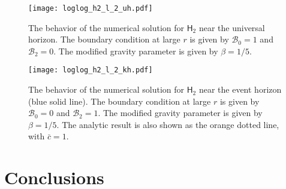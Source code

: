 \documentclass[aps,prd,preprintnumbers,superscriptaddress,nofootinbib,notitlepage]{revtex4-2}
\begin{document}
        \begin{figure}[tb]
            \begin{minipage}[b]{0.45\columnwidth}
                    \centering    \texttt{[image: loglog\_h2\_l\_2\_uh.pdf]}\centering
                    \caption{The behavior of the numerical solution for $\mathsf{H}_2$ near the universal horizon. The boundary condition at large $r$ is given by
                    $\mathcal{B}_0=1$ and $\mathcal{B}_2=0$.
                    The modified gravity parameter is given by $\beta=1/5$.}
                \label{fig:loglog_chi_l=2_uh.pdf}
            \end{minipage}
            \hspace{0.04\columnwidth}
            \begin{minipage}[b]{0.45\columnwidth}
                    \centering    \texttt{[image: loglog\_h2\_l\_2\_kh.pdf]}\centering
                 \caption{The behavior of the numerical solution for $\mathsf{H}_2$ near the event horizon (blue solid line).
                 The boundary condition at large $r$ is given by
                    $\mathcal{B}_0=0$ and $\mathcal{B}_2=1$.
                    The modified gravity parameter is given by $\beta=1/5$.
                    The analytic result is also shown as the orange dotted line, with $\bar c=1$.}
                \label{fig:loglog_chi_l=2_kh.pdf}
            \end{minipage}
        \end{figure}       





\section{Conclusions}\label{conclusion}
\end{document}
